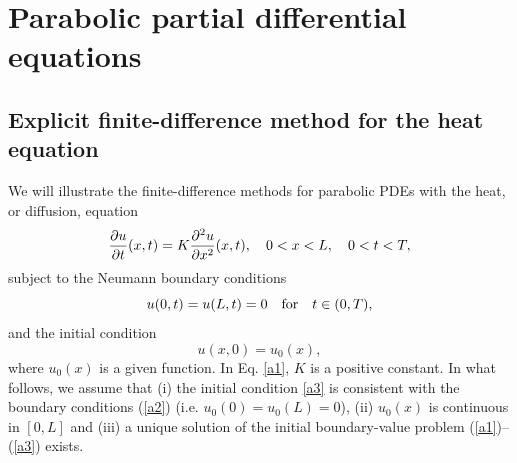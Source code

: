 %
%
%


\section{Parabolic partial differential equations}

\subsection{Explicit finite-difference method for the heat equation}
 
We will illustrate the finite-difference
methods for parabolic PDEs with the heat, or diffusion, equation
\begin{equation}\label{a1}
\frac{{\partial} u}{{\partial} t}(x,t) = K\frac{{\partial}^{2} u}{{\partial} x^{2}}(x,t), \quad
0<x< L, \quad 0 < t < T,
\end{equation}
subject to the Neumann boundary conditions
\begin{equation}\label{a2}
u(0, t) = u(L, t)=0 \quad \hbox{for} \quad t\in (0,T),
\end{equation}
and the initial condition
\begin{equation}\label{a3}
u(x, 0) = u_{0}(x),
\end{equation}
where $u_{0}(x)$ is a given function. In Eq. \eqref{a1}, $K$ is a positive
constant.
In what follows, we assume that (i) the initial condition \eqref{a3} is consistent with
the boundary conditions (\ref{a2}) (i.e. $u_{0}(0)=u_{0}(L)=0$), (ii) $u_{0}(x)$ is continuous
in $[0,L]$ and (iii) a unique solution of the initial boundary-value problem (\ref{a1})--(\ref{a3}) exists.
 
